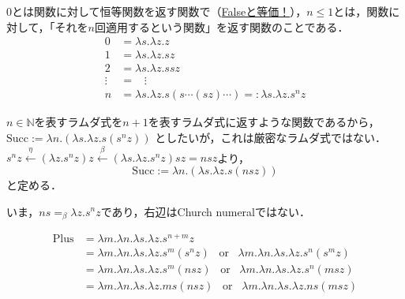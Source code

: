 \documentclass[uplatex, 12pt, dvipdfmx]{jsreport}
\begin{document}
\begin{shadebox}\begin{definition}
    $0$とは関数に対して恒等関数を返す関数で（\underline{Falseと等価！}），$n\le 1$とは，関数に対して，「それを$n$回適用するという関数」を返す関数のことである．
    \begin{align*}
        0 &= \lambda s.\lambda z.z \\
        1 &= \lambda s.\lambda z.sz \\
        2 &= \lambda s.\lambda z.ssz \\
        \!\!\vdots &= \;\;\; \vdots \\
        n &= \lambda s.\lambda z.s(s\cdots (sz)\cdots ) =: \lambda s.\lambda z.s^nz
    \end{align*}
\end{definition}\end{shadebox}

\begin{definition}[後者関数]
    $n\in\mathbb{N}$を表すラムダ式を$n+1$を表すラムダ式に返すような関数であるから，
    $\mathrm{Succ}:=\lambda n.(\lambda s.\lambda z.s(s^nz))$
    としたいが，これは厳密なラムダ式ではない．$s^nz\xleftarrow{\eta}(\lambda z.s^nz)z\xleftarrow{\beta}(\lambda s.\lambda z.s^nz)sz=nsz$より，
    \[ \mathrm{Succ}:=\lambda n.(\lambda s.\lambda z.s(nsz)) \]
    と定める．
\end{definition}
\begin{remark}
    いま，$ns=_\beta \lambda z.s^nz$であり，右辺はChurch numeralではない．
\end{remark}

\begin{definition}[加法]
    \begin{align*}
        \mathrm{Plus} &= \lambda m.\lambda n.\lambda s.\lambda z.s^{n+m}z \\
        &= \lambda m.\lambda n.\lambda s.\lambda z.s^m(s^nz)\;\;\;\mathrm{or}\;\;\; \lambda m.\lambda n.\lambda s.\lambda z.s^n(s^mz) \\
        &= \lambda m.\lambda n.\lambda s.\lambda z.s^m(nsz)\;\;\;\mathrm{or}\;\;\; \lambda m.\lambda n.\lambda s.\lambda z.s^n(msz) \\
        &= \lambda m.\lambda n.\lambda s.\lambda z.ms(nsz)\;\;\;\mathrm{or}\;\;\; \lambda m.\lambda n.\lambda s.\lambda z.ns(msz)
    \end{align*}
\end{definition}
\end{document}
